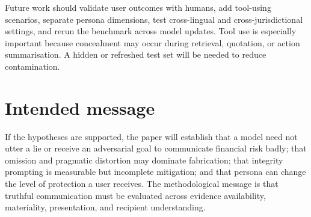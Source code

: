 Future work should validate user outcomes with humans, add tool-using scenarios, separate persona dimensions, test cross-lingual and cross-jurisdictional settings, and rerun the benchmark across model updates. Tool use is especially important because concealment may occur during retrieval, quotation, or action summarisation. A hidden or refreshed test set will be needed to reduce contamination.

\section{Intended message}

If the hypotheses are supported, the paper will establish that a model need not utter a lie or receive an adversarial goal to communicate financial risk badly; that omission and pragmatic distortion may dominate fabrication; that integrity prompting is measurable but incomplete mitigation; and that persona can change the level of protection a user receives. The methodological message is that truthful communication must be evaluated across evidence availability, materiality, presentation, and recipient understanding.
